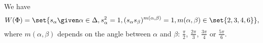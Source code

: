 We have
\[ W(\Phi) = \set{s_\alpha\given \alpha \in \Delta, s_\alpha^2 = 1, (s_\alpha s_\beta)^{m(\alpha, \beta)} = 1, m(\alpha, \beta)\in \set{2, 3, 4, 6}}, \]
where $m(\alpha, \beta)$ depends on the angle between $\alpha$ and $\beta$: $\frac{\pi}{2}$, $\frac{2\pi}{3}$, $\frac{3\pi}{4}$ or $\frac{5\pi}{6}$.
